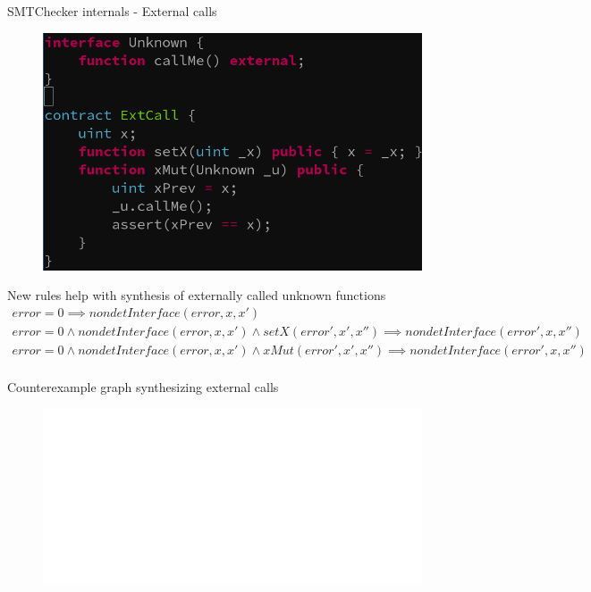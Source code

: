 \documentclass[aspectratio=169,10pt]{beamer}
\begin{document}
\begin{frame}[fragile]
\begin{center}
SMTChecker internals - External calls
\begin{figure}
	\includegraphics[scale=0.3]{images/extcall_fail_code}
\end{figure}
\end{center}
\end{frame}

\begin{frame}[fragile]
New rules help with synthesis of externally called unknown functions
{\small
\begin{align*}
error = 0 \implies nondetInterface(error, x, x') \\
error = 0 \land	nondetInterface(error, x, x') \land setX(error', x', x'') \implies nondetInterface(error', x, x'') \\
error = 0 \land	nondetInterface(error, x, x') \land xMut(error', x', x'') \implies nondetInterface(error', x, x'') \\
\end{align*}
}%
\end{frame}

\begin{frame}[fragile]
\begin{center}
Counterexample graph synthesizing external calls
\begin{figure}
	\includegraphics[scale=0.4]{images/extcall_fail_cex_graph}
\end{figure}
\end{center}
\end{frame}
\end{document}
